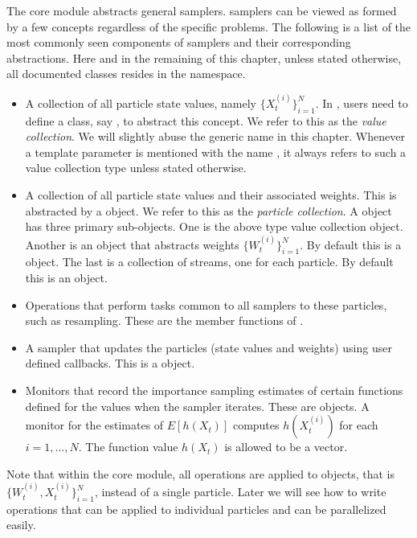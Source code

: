 The core module abstracts general \smc samplers. \smc samplers can be viewed
as formed by a few concepts regardless of the specific problems. The following
is a list of the most commonly seen components of \smc samplers and their
corresponding \vsmc abstractions. Here and in the remaining of this chapter,
unless stated otherwise, all documented classes resides in the 
namespace.
\begin{itemize}
  \item A collection of all particle state values, namely
    $\{X_t^{(i)}\}_{i=1}^N$. In \vsmc, users need to define a class, say
    , to abstract this concept. We refer to this as the \emph{value
      collection}. We will slightly abuse the generic name  in this
    chapter. Whenever a template parameter is mentioned with the name
    , it always refers to such a value collection type unless stated
    otherwise.
  \item A collection of all particle state values and their associated
    weights. This is abstracted by a  object. We refer to
    this as the \emph{particle collection}. A  object has
    three primary sub-objects. One is the above type  value collection
    object. Another is an object that abstracts weights
    $\{W_t^{(i)}\}_{i=1}^N$. By default this is a  object. The
    last is a collection of \rng streams, one for each particle. By default
    this is an  object.
  \item Operations that perform tasks common to all samplers to these
    particles, such as resampling. These are the member functions of
    .
  \item A sampler that updates the particles (state values and weights) using
    user defined callbacks. This is a  object.
  \item Monitors that record the importance sampling estimates of certain
    functions defined for the values when the sampler iterates. These are
     objects. A monitor for the estimates of $E[h(X_t)]$
    computes $h(X_t^{(i)})$ for each $i = 1,\dots,N$. The function value
    $h(X_t)$ is allowed to be a vector.
\end{itemize}
Note that within the core module, all operations are applied to
 objects, that is $\{W_t^{(i)},X_t^{(i)}\}_{i=1}^N$, instead
of a single particle. Later we will see how to write operations that can be
applied to individual particles and can be parallelized easily.

